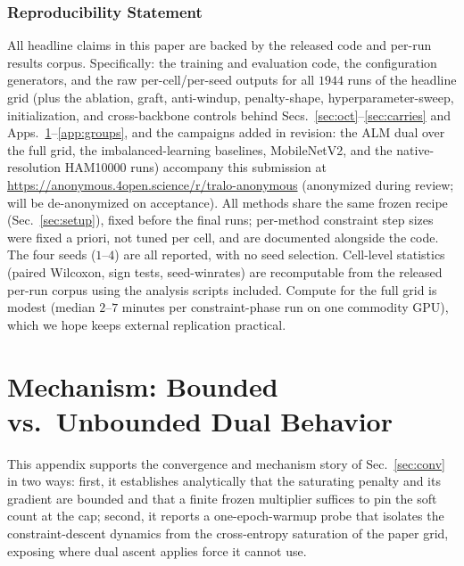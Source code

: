 \documentclass[10pt]{article}
\begin{document}
\subsubsection*{Reproducibility Statement}
All headline claims in this paper are backed by the released code and
per-run results corpus. Specifically: the training and evaluation code,
the configuration generators, and the raw per-cell/per-seed outputs for
all $1944$ runs of the headline grid (plus the ablation, graft,
anti-windup, penalty-shape, hyperparameter-sweep, initialization, and
cross-backbone controls behind
Secs.~\ref{sec:oct}--\ref{sec:carries} and Apps.~\ref{app:mech}--\ref{app:groups}{\color{blue},
and the campaigns added in revision: the ALM dual over the full grid, the
imbalanced-learning baselines, MobileNetV2, and the native-resolution
HAM10000 runs})
accompany this submission at
\url{https://anonymous.4open.science/r/tralo-anonymous}
(anonymized during review; will be de-anonymized on acceptance). All
methods share the same frozen recipe (Sec.~\ref{sec:setup}), fixed before
the final runs; per-method constraint step sizes were fixed a priori, not
tuned per cell, and are documented alongside the code. The four seeds
($1$--$4$) are all reported, with no seed selection. Cell-level statistics (paired Wilcoxon, sign tests,
seed-winrates) are recomputable from the released per-run corpus using
the analysis scripts included. Compute for the full grid is modest
(median $2$--$7$ minutes per constraint-phase run on one commodity GPU),
which we hope keeps external replication practical.




\appendix

\section{Mechanism: Bounded vs.\ Unbounded Dual Behavior}
\label{app:mech}

This appendix supports the convergence and mechanism story of
Sec.~\ref{sec:conv} in two ways: first, it establishes analytically that
the saturating penalty and its gradient are bounded and that a finite
frozen multiplier suffices to pin the soft count at the cap; second, it
reports a one-epoch-warmup probe that isolates the constraint-descent
dynamics from the cross-entropy saturation of the paper grid, exposing
where dual ascent applies force it cannot use.
\end{document}
